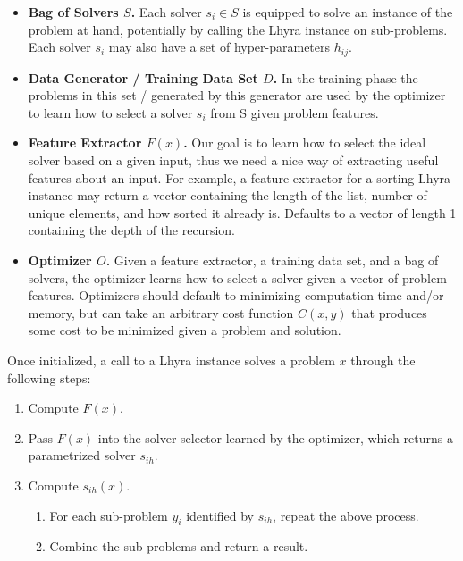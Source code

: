 \documentclass{article}
\begin{document}
\begin{itemize}
	\item \textbf{Bag of Solvers $S$.} Each solver $s_i \in S$ is equipped to solve an instance of the problem at hand, potentially by calling the Lhyra instance on sub-problems. Each solver $s_i$ may also have a set of hyper-parameters $h_{ij}$. 

	\item \textbf{Data Generator / Training Data Set $D$.} In the training phase the problems in this set / generated by this generator are used by the optimizer to learn how to select a solver $s_i$ from S given problem features.

	\item \textbf{Feature Extractor $F(x)$.} Our goal is to learn how to select the ideal solver based on a given input, thus we need a nice way of extracting useful features about an input. For example, a feature extractor for a sorting Lhyra instance may return a vector containing the length of the list, number of unique elements, and how sorted it already is. Defaults to a vector of length 1 containing the depth of the recursion.

	\item \textbf{Optimizer $O$.} Given a feature extractor, a training data set, and a bag of solvers, the optimizer learns how to select a solver given a vector of problem features.  Optimizers should default to minimizing computation time and/or memory, but can take an arbitrary cost function $C(x,y)$ that produces some cost to be minimized given a problem and solution. 
\end{itemize}

Once initialized, a call to a Lhyra instance solves a problem $x$ through the following steps:

\begin{enumerate}
	\item Compute $F(x)$.
	\item Pass $F(x)$ into the solver selector learned by the optimizer, which returns a parametrized solver $s_{ih}$.
	\item Compute $s_{ih}(x)$.
	\begin{enumerate}
		\item For each sub-problem $y_i$ identified by $s_{ih}$, repeat the above process.
		\item Combine the sub-problems and return a result.
	\end{enumerate}
\end{enumerate}
\end{document}
